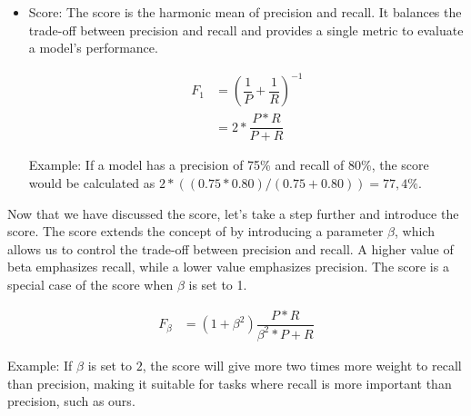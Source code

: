 \begin{itemize}
    \item \fOne{} Score: The \fOne{} score is the harmonic mean of precision and recall. It balances the trade-off between precision and recall and provides a single metric to evaluate a model's performance.

    \begin{align}
    F_1 &= \left(\dfrac{1}{P} + \dfrac{1}{R}\right)^{-1} \label{eq:def_f1}\\
        &= 2 * \dfrac{P * R}{P + R}
    \end{align}


    Example: If a model has a precision of 75\% and recall of 80\%, the \fOne{} score would be calculated as $2 * ((0.75 * 0.80) / (0.75 + 0.80)) = 77, 4\%$.


    
\end{itemize}

Now that we have discussed the \fOne{} score, let's take a step further and introduce the \fBeta{} score. The \fBeta{} score extends the concept of \fOne{} by introducing a parameter $\beta$, which allows us to control the trade-off between precision and recall. A higher value of beta emphasizes recall, while a lower value emphasizes precision. The \fOne{} score is a special case of the \fBeta{} score when $\beta$ is set to 1.


\begin{align}
    F_\beta &= (1+\beta^2) \dfrac{P * R}{\beta^2* P + R} \label{eq:def_f_beta}
\end{align}


Example: If $\beta$ is set to $2$, the \fTwo{} score will give more two times more weight to recall than precision, making it suitable for tasks where recall is more important than precision, such as ours.





